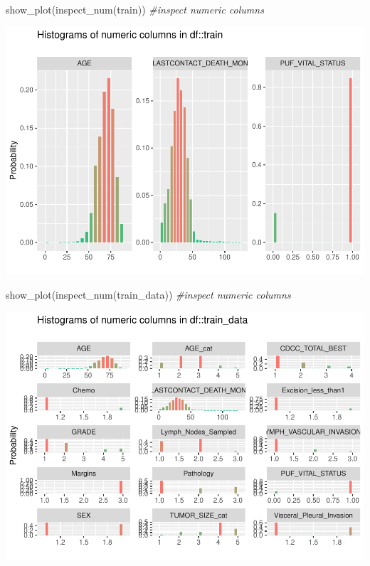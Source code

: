 \documentclass[
  11pt,
]{article}
\newenvironment{Shaded}{\begin{snugshade}}{\end{snugshade}}
\newcommand{\CommentTok}[1]{\textcolor[rgb]{0.56,0.35,0.01}{\textit{#1}}}
\newcommand{\FunctionTok}[1]{\textcolor[rgb]{0.00,0.00,0.00}{#1}}
\newcommand{\NormalTok}[1]{#1}
\begin{document}
\begin{Shaded}
\begin{Highlighting}[]
\FunctionTok{show\_plot}\NormalTok{(}\FunctionTok{inspect\_num}\NormalTok{(train)) }\CommentTok{\#inspect numeric columns }
\end{Highlighting}
\end{Shaded}

\includegraphics{Hazard_and_Risk_plot_updated_files/figure-latex/unnamed-chunk-10-2.pdf}

\begin{Shaded}
\begin{Highlighting}[]
\FunctionTok{show\_plot}\NormalTok{(}\FunctionTok{inspect\_num}\NormalTok{(train\_data)) }\CommentTok{\#inspect numeric columns }
\end{Highlighting}
\end{Shaded}

\includegraphics{Hazard_and_Risk_plot_updated_files/figure-latex/unnamed-chunk-10-3.pdf}
\end{document}
